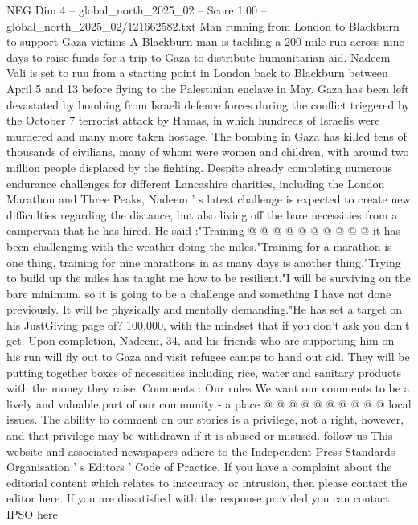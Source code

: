 \begin{textsample}{NEG Dim 4 – global\_north\_2025\_02 – Score 1.00 – global\_north\_2025\_02/121662582.txt}  \label{ex:f4_neg_409}
Man running from London to Blackburn to support Gaza victims A Blackburn man is tackling a 200-mile run across nine days to raise funds for a trip to Gaza to distribute humanitarian aid.
Nadeem Vali is set to run from a starting point in London back to Blackburn between April 5 and 13 before flying to the Palestinian enclave in May.
Gaza has been left devastated by bombing from Israeli defence forces during the conflict triggered by the October 7 terrorist attack by Hamas, in which hundreds of Israelis were murdered and many more taken hostage.
The bombing in Gaza has killed tens of thousands of civilians, many of whom were women and children, with around two million people displaced by the fighting.
Despite already completing numerous endurance challenges for different Lancashire charities, including the London Marathon and Three Peaks, Nadeem ' s latest challenge is expected to create new difficulties regarding the distance, but also living off the bare necessities from a campervan that he has hired.
He said :"Training @ @ @ @ @ @ @ @ @ @ it has been challenging with the weather doing the miles."Training for a marathon is one thing, training for nine marathons in as many days is another thing."Trying to build up the miles has taught me how to be resilient."I will be surviving on the bare minimum, so it is going to be a challenge and something I have not done previously.
It will be physically and mentally demanding."He has set a target on his JustGiving page of? 100,000, with the mindset that if you don't ask you don't get.
Upon completion, Nadeem, 34, and his friends who are supporting him on his run will fly out to Gaza and visit refugee camps to hand out aid.
They will be putting together boxes of necessities including rice, water and sanitary products with the money they raise.
Comments : Our rules We want our comments to be a lively and valuable part of our community - a place @ @ @ @ @ @ @ @ @ @ local issues.
The ability to comment on our stories is a privilege, not a right, however, and that privilege may be withdrawn if it is abused or misused. follow us This website and associated newspapers adhere to the Independent Press Standards Organisation ' s Editors ' Code of Practice.
If you have a complaint about the editorial content which relates to inaccuracy or intrusion, then please contact the editor here.
If you are dissatisfied with the response provided you can contact IPSO here

\end{textsample}

